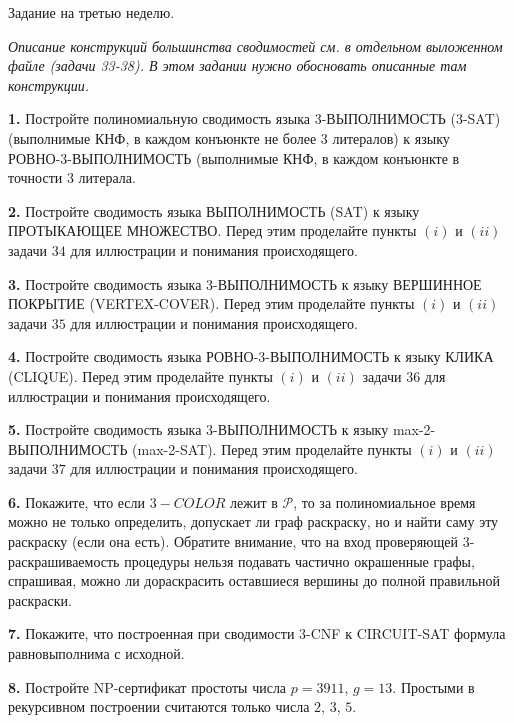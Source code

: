 \documentclass[12pt,a5paper,fleqn]{article}
\begin{document}
\begin{center}
{ \Large Задание на третью неделю.}

\textit{Описание конструкций большинства сводимостей см. в отдельном выложенном файле (задачи 33-38). В этом задании нужно обосновать описанные там конструкции.}

\end{center}



{\bf 1.} Постройте полиномиальную сводимость языка 3-ВЫПОЛНИМОСТЬ (3-SAT) (выполнимые КНФ, в каждом конъюнкте не более 3 литералов) к языку РОВНО-3-ВЫПОЛНИМОСТЬ (выполнимые КНФ, в каждом конъюнкте в точности $3$ литерала.

\smallskip

{\bf 2.} Постройте сводимость языка ВЫПОЛНИМОСТЬ (SAT) к языку ПРОТЫКАЮЩЕЕ МНОЖЕСТВО. Перед этим проделайте пункты $(i)$ и $(ii)$ задачи $34$ для иллюстрации и понимания происходящего.

\smallskip

{\bf 3.} Постройте сводимость языка 3-ВЫПОЛНИМОСТЬ к языку ВЕРШИННОЕ ПОКРЫТИЕ (VERTEX-COVER). Перед этим проделайте пункты $(i)$ и $(ii)$ задачи $35$ для иллюстрации и понимания происходящего.

\smallskip

{\bf 4.} Постройте сводимость языка РОВНО-3-ВЫПОЛНИМОСТЬ к языку КЛИКА (CLIQUE). Перед этим проделайте пункты $(i)$ и $(ii)$ задачи $36$ для иллюстрации и понимания происходящего.

\smallskip

{\bf 5.} Постройте сводимость языка 3-ВЫПОЛНИМОСТЬ к языку max-2-ВЫПОЛНИМОСТЬ (max-2-SAT). Перед этим проделайте пункты $(i)$ и $(ii)$ задачи $37$ для иллюстрации и понимания происходящего.

\smallskip

{\bf 6.} Покажите, что если $3-COLOR$ лежит в $\mathcal{P}$, то за полиномиальное время можно не только определить, допускает ли граф раскраску, но и найти саму эту раскраску (если она есть). Обратите внимание, что на вход проверяющей 3-раскрашиваемость процедуры нельзя подавать частично окрашенные графы, спрашивая, можно ли дораскрасить оставшиеся вершины до полной правильной раскраски.

\smallskip

{\bf 7.} Покажите, что построенная при сводимости 3-CNF к CIRCUIT-SAT формула равновыполнима с исходной. 

\smallskip

{\bf 8.} Постройте NP-сертификат простоты числа $p = 3911$, $g = 13$. Простыми в рекурсивном построении считаются только числа $2$, $3$, $5$.
\end{document}
